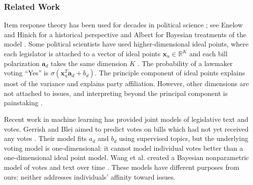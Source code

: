 


\subsubsection{Related Work}

Item response theory has been used for decades in political science
\citep{clinton:2004,martin:2002,poole:1985}; see Enelow and Hinich for
a historical perspective \citep{enelow:1984} and Albert for Bayesian
treatments of the model \citep{albert:1992}.  Some political scientists
have used higher-dimensional ideal points, where each legislator is
attached to a vector of ideal points $\bm x_u \in \mathbb{R}^K$ and
each bill polarization $\bm a_d$ takes the same dimension $K$
\citep{heckman:1996}. The probability of a lawmaker voting ``Yes'' is
$\sigma(\bm x_u^T \bm a_d + b_d)$.  The principle component of ideal
points explains most of the variance and explains party affiliation.
However, other dimensions are not attached to issues, and
interpreting beyond the principal component is painstaking
\citep{jackman:2001}.

Recent work in machine learning has provided joint models of
legislative text and votes. Gerrish and Blei aimed to predict votes on
bills which had not yet received any votes \citep{gerrish:2011}.  Their
model fits $a_d$ and $b_d$ using supervised topics, but the underlying
voting model is one-dimensional: it cannot model individual votes
better than a one-dimensional ideal point model. Wang et al. created a
Bayesian nonparametric model of votes and text over time
\citep{wang:2010}.  These models have different purposes from ours:
neither addresses individuals' affinity toward issues.

